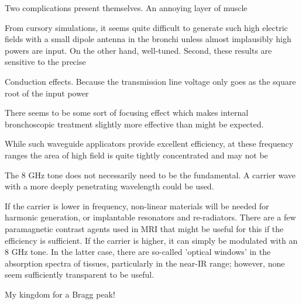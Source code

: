 \documentclass[paper.tex]{subfiles}
\begin{document}
Two complications present themselves. An annoying layer of muscle 


From cursory simulations, it seems quite difficult to generate such high electric fields with a small dipole antenna in the bronchi unless almost implausibly high powers are input. On the other hand, well-tuned. Second, these results are sensitive to the precise




Conduction effects. Because the transmission line voltage only goes as the square root of the input power

There seems to be some sort of focusing effect which makes internal bronchoscopic treatment slightly more effective than might be expected.


While such waveguide applicators provide excellent efficiency, at these frequency ranges the area of high field is quite tightly concentrated and may not be 



The 8 GHz tone does not necessarily need to be the fundamental. A carrier wave with a more deeply penetrating wavelength could be used. 

If the carrier is lower in frequency, non-linear materials\cite{Theory1973} will be needed for harmonic generation, or implantable resonators and re-radiators. There are a few paramagnetic contrast agents used in MRI that might be useful for this if the efficiency is sufficient. If the carrier is higher, it can simply be modulated with an 8 GHz tone. In the latter case, there are so-called 'optical windows' in the absorption spectra of tissues, particularly in the near-IR range; however, none seem sufficiently transparent to be useful.

My kingdom for a Bragg peak!




\clearpage
\printbibliography[heading=none, title={}, keyword={standards}]
\end{document}
